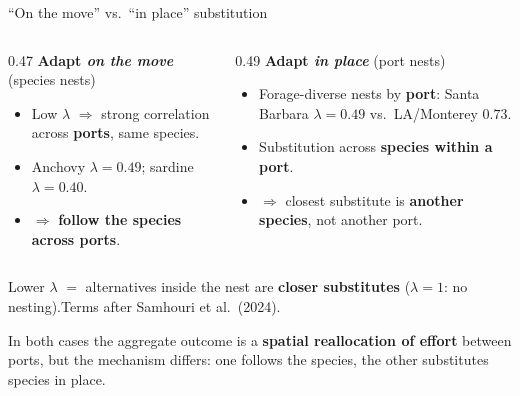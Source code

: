 \documentclass[aspectratio=169,11pt]{beamer}
\newcommand{\takeaway}[1]{\vfill\begin{takeawaybox}\small #1\end{takeawaybox}\vskip2pt}
\begin{document}
\begin{frame}{``On the move'' vs.\ ``in place'' substitution}
\begin{columns}[T,onlytextwidth]
\begin{column}{0.47\textwidth}
\textbf{Adapt \emph{on the move}} {\scriptsize(species nests)}
\begin{itemize}\small
  \item Low $\lambda$ $\Rightarrow$ strong correlation across \textbf{ports}, same species.
  \item Anchovy $\lambda=0.49$; sardine $\lambda=0.40$.
  \item $\Rightarrow$ \textbf{follow the species across ports}.
\end{itemize}
\end{column}
\hfill
\begin{column}{0.49\textwidth}
\textbf{Adapt \emph{in place}} {\scriptsize(port nests)}
\begin{itemize}\small
  \item Forage-diverse nests by \textbf{port}: Santa Barbara $\lambda=0.49$ vs.\ LA/Monterey $0.73$.
  \item Substitution across \textbf{species within a port}.
  \item $\Rightarrow$ closest substitute is \textbf{another species}, not another port.
\end{itemize}
\end{column}
\end{columns}
\vskip2pt
{\scriptsize\color{black!60}
Lower $\lambda$ $=$ alternatives inside the nest are \textbf{closer substitutes} ($\lambda=1$: no
nesting).\quad\textbullet\quad Terms after Samhouri et al.\ (2024).\par}
\takeaway{In both cases the aggregate outcome is a \textbf{spatial reallocation of effort}
between ports, but the mechanism differs: one follows the species, the other substitutes species in place.}
\end{frame}
\end{document}
